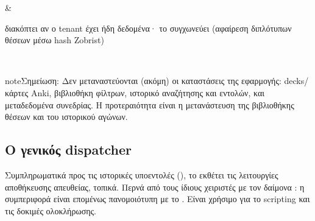 \documentclass[letterpaper,10pt,greek]{sphinxmanual}
\begin{document}
\begin{savenotes}
\begin{tabular}[t]{}
\begin{varwidth}[t]{}
\sphinxbeforeendvarwidth
\end{varwidth}%
&\begin{varwidth}[t]{}
\sphinxAtStartPar
{} διακόπτει αν ο tenant έχει ήδη δεδομένα· το  συγχωνεύει (αφαίρεση διπλότυπων θέσεων μέσω hash Zobrist)
\sphinxbeforeendvarwidth
\end{varwidth}%
\\
\sphinxbottomrule
\end{tabular}
\sphinxtableafterendhook\par
\sphinxattableend\end{savenotes}

\begin{sphinxadmonition}{note}{Σημείωση:}
\sphinxAtStartPar
Δεν μεταναστεύονται (ακόμη) οι καταστάσεις της εφαρμογής: decks/κάρτες Anki, βιβλιοθήκη φίλτρων, ιστορικό αναζήτησης και εντολών, και μεταδεδομένα συνεδρίας. Η προτεραιότητα είναι η μετανάστευση της βιβλιοθήκης θέσεων και του ιστορικού αγώνων.
\end{sphinxadmonition}


\subsection{Ο γενικός dispatcher }
\label{\detokenize{mode_headless:le-dispatcher-generique-call}}\label{\detokenize{mode_headless:headless-call}}
\sphinxAtStartPar
Συμπληρωματικά προς τις ιστορικές υποεντολές ({\hyperref[\detokenize{cli:cli}]{}}), το  εκθέτει  τις λειτουργίες αποθήκευσης απευθείας, τοπικά. Περνά από τους ίδιους χειριστές με τον δαίμονα : η συμπεριφορά είναι επομένως πανομοιότυπη με το . Είναι χρήσιμο για το scripting και τις δοκιμές ολοκλήρωσης.
\end{document}
